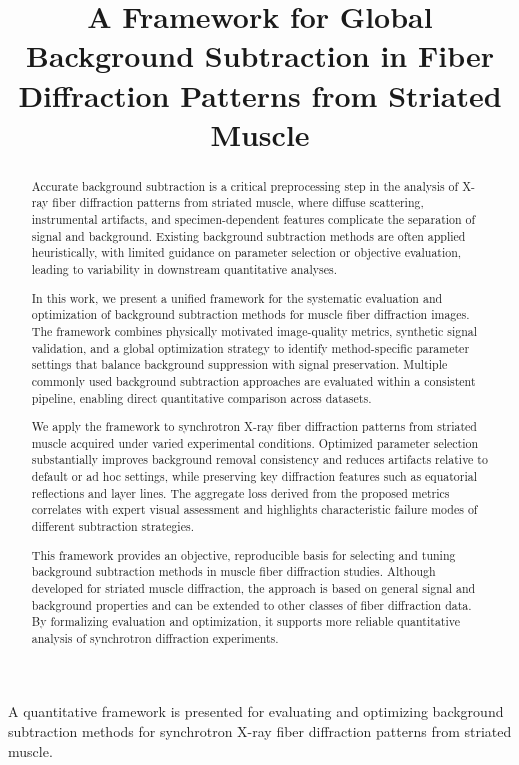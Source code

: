 \documentclass[iucr]{iucrjournals}
\title{A Framework for Global Background Subtraction in Fiber Diffraction Patterns from Striated Muscle}
\author{}
\date{}
\begin{document}
\maketitle

\begin{synopsis}
A quantitative framework is presented for evaluating and optimizing background subtraction methods for synchrotron X-ray fiber diffraction patterns from striated muscle.
\end{synopsis}


\begin{abstract}

Accurate background subtraction is a critical preprocessing step in the analysis of X-ray fiber diffraction patterns from striated muscle, where diffuse scattering, instrumental artifacts, and specimen-dependent features complicate the separation of signal and background. Existing background subtraction methods are often applied heuristically, with limited guidance on parameter selection or objective evaluation, leading to variability in downstream quantitative analyses.

In this work, we present a unified framework for the systematic evaluation and optimization of background subtraction methods for muscle fiber diffraction images. The framework combines physically motivated image-quality metrics, synthetic signal validation, and a global optimization strategy to identify method-specific parameter settings that balance background suppression with signal preservation. Multiple commonly used background subtraction approaches are evaluated within a consistent pipeline, enabling direct quantitative comparison across datasets.

We apply the framework to synchrotron X-ray fiber diffraction patterns from striated muscle acquired under varied experimental conditions. Optimized parameter selection substantially improves background removal consistency and reduces artifacts relative to default or ad hoc settings, while preserving key diffraction features such as equatorial reflections and layer lines. The aggregate loss derived from the proposed metrics correlates with expert visual assessment and highlights characteristic failure modes of different subtraction strategies.

This framework provides an objective, reproducible basis for selecting and tuning background subtraction methods in muscle fiber diffraction studies. Although developed for striated muscle diffraction, the approach is based on general signal and background properties and can be extended to other classes of fiber diffraction data. By formalizing evaluation and optimization, it supports more reliable quantitative analysis of synchrotron diffraction experiments.

\end{abstract}
\end{document}
